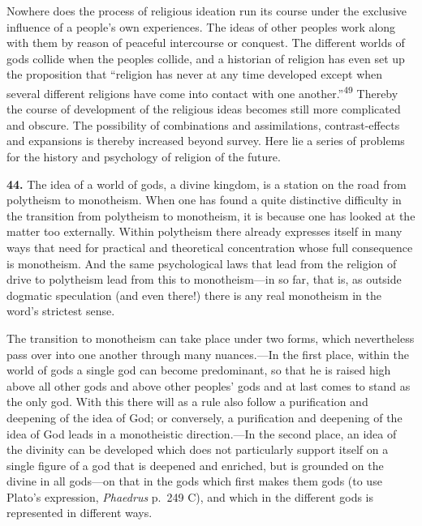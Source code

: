 \documentclass[12pt,a4paper]{book}
\newcommand{\opage}[1]{\marginnote{\footnotesize\textit{[#1]}}}
\begin{document}
Nowhere does the process of religious ideation run its course under the exclusive influence of a
people's own experiences. The ideas of other peoples work along with them by reason of peaceful
intercourse or conquest. The different worlds of gods collide when the peoples collide, and a
historian of religion has even set up the proposition that ``religion has never at any time
developed except when several different religions have come into contact with one
another.''\textsuperscript{49} Thereby the course of development of the religious ideas becomes
still more complicated and obscure. The possibility of combinations and assimilations,
contrast-effects and expansions is thereby increased beyond survey. Here lie a series of problems
for the history and psychology of religion of the future.

\medskip

\noindent\textbf{44.} The idea of a world of gods, a divine kingdom, is a station on
the road from polytheism to monotheism. When one has found a quite distinctive
difficulty in the transition from polytheism to monotheism, it is because one has looked
at the matter too externally. Within polytheism there already expresses itself in many
ways that need for practical and theoretical concentration whose full consequence is
monotheism. And the same psychological laws that lead from the religion of drive to
polytheism lead from this to monotheism---in so far, that is, as outside dogmatic
speculation (and even there!) there is any real monotheism in the word's strictest sense.

The transition to monotheism can take place under two forms, 
\opage{102}which nevertheless pass over
into one another through many nuances.---In the first place, within the world of gods a
single god can become predominant, so that he is raised high above all other gods and
above other peoples' gods and at last comes to stand as the only god. With this there
will as a rule also follow a purification and deepening of the idea of God; or conversely,
a purification and deepening of the idea of God leads in a monotheistic direction.---In
the second place, an idea of the divinity can be developed which does not particularly
support itself on a single figure of a god that is deepened and enriched, but is grounded
on the divine in all gods---on that in the gods which first makes them gods (to use
Plato's expression, \emph{Phaedrus} p.~249 C), and which in the different gods is
represented in different ways.
\end{document}
